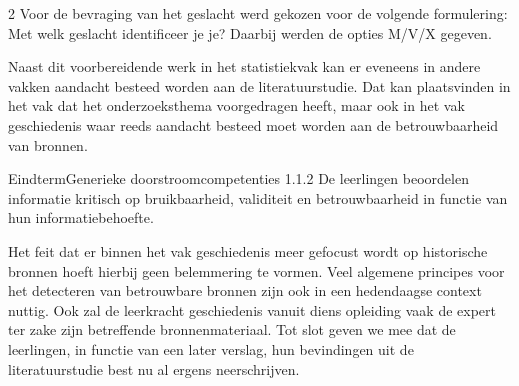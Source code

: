 \begin{multicols}{2}
Voor de bevraging van het geslacht werd gekozen voor de volgende formulering: Met welk geslacht identificeer je je? Daarbij werden de opties M/V/X gegeven.
    
Naast dit voorbereidende werk in het statistiekvak kan er eveneens in andere vakken aandacht besteed worden aan de literatuurstudie. Dat kan plaatsvinden in het vak dat het onderzoeksthema voorgedragen heeft, maar ook in het vak geschiedenis waar reeds aandacht besteed moet worden aan de betrouwbaarheid van bronnen.
    
\begin{kader}{Eindterm}{Generieke doorstroomcompetenties}
             1.1.2 De leerlingen beoordelen informatie kritisch op bruikbaarheid, validiteit en betrouwbaarheid in functie van hun informatiebehoefte.
\end{kader}

Het feit dat er binnen het vak geschiedenis meer gefocust wordt op historische bronnen hoeft hierbij geen belemmering te vormen. Veel algemene principes voor het detecteren van betrouwbare bronnen zijn ook in een hedendaagse context nuttig. Ook zal de leerkracht geschiedenis vanuit diens opleiding vaak de expert ter zake zijn betreffende bronnenmateriaal. Tot slot geven we mee dat de leerlingen, in functie van een later verslag, hun bevindingen uit de literatuurstudie best nu al ergens neerschrijven.






\end{multicols}

